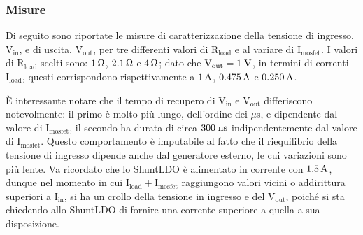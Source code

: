 \subsubsection{Misure}

Di seguito sono riportate le misure di caratterizzazione della tensione di ingresso, $\mathrm{V_{in}}$, e di uscita, $\mathrm{V_{out}}$, per tre differenti valori di $\mathrm{R_{load}}$ e al variare di $\mathrm{I_{mosfet}}$.
I valori di $\mathrm{R_{load}}$ scelti sono: $1 {\rm \, \Omega}$, $2.1 {\rm \, \Omega}$ e $4 {\rm \, \Omega}$; dato che $\mathrm{V_{out}=1 \rm \; V}$, in termini di correnti  $\mathrm{I_{load}}$, questi corrispondono rispettivamente a $1 \rm \, A$, $0.475 \rm \, A$ e $0.250 \rm \, A$.

\`E interessante notare che il tempo di recupero di $\mathrm{V_{in}}$ e $\mathrm{V_{out}}$ differiscono notevolmente: il primo è molto più lungo, dell'ordine dei $\mu$s, e dipendente dal valore di $\mathrm{I_{mosfet}}$, il secondo ha durata di circa $300 \rm \; ns$ indipendentemente dal valore di $\mathrm{I_{mosfet}}$.
Questo comportamento è imputabile al fatto che il riequilibrio della tensione di ingresso dipende anche dal generatore esterno, le cui variazioni sono più lente.
Va ricordato che lo ShuntLDO è alimentato in corrente con $1.5 \rm \, A$, dunque nel momento in cui $\mathrm{I_{load}+I_{mosfet}}$ raggiungono valori vicini o addirittura superiori  a $\mathrm{I_{in}}$, si ha un crollo della tensione in ingresso e del $\mathrm{V_{out}}$, poiché si sta chiedendo allo ShuntLDO di fornire una corrente superiore a quella a sua disposizione.

